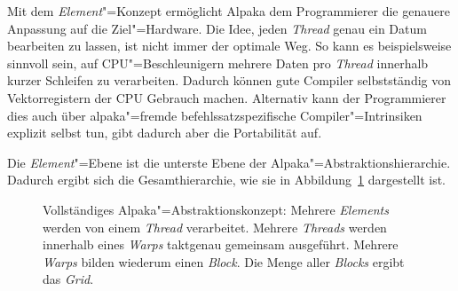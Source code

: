 Mit dem \textit{Element}"=Konzept ermöglicht Alpaka dem Programmierer die
genauere Anpassung auf die Ziel"=Hardware. Die Idee, jeden \textit{Thread} genau
ein Datum bearbeiten zu lassen, ist nicht immer der optimale Weg. So kann es
beispielsweise sinnvoll sein, auf CPU"=Beschleunigern mehrere Daten pro
\textit{Thread} innerhalb kurzer Schleifen zu verarbeiten. Dadurch können gute
Compiler selbstständig von Vektorregistern der CPU Gebrauch machen. Alternativ
kann der Programmierer dies auch über alpaka"=fremde befehlssatzspezifische
Compiler"=Intrinsiken explizit selbst tun, gibt dadurch aber die Portabilität
auf.

Die \textit{Element}"=Ebene ist die unterste Ebene der
Alpaka"=Abstraktionshierarchie. Dadurch ergibt sich die Gesamthierarchie, wie
sie in Abbildung~\ref{alpaka:konzepte:abstraktion:elements:vollstaendig}
dargestellt ist.

\begin{figure}
    \centering
    \caption[Vollständiges Alpaka-Abstraktionskonzept]
            {Vollständiges Alpaka"=Abstraktionskonzept: Mehrere
             \textit{Elements} werden von einem \textit{Thread} verarbeitet.
             Mehrere \textit{Threads} werden innerhalb eines \textit{Warps}
             taktgenau gemeinsam ausgeführt. Mehrere \textit{Warps} bilden
             wiederum einen \textit{Block}. Die Menge aller \textit{Blocks}
             ergibt das \textit{Grid}. \cite[nach][22]{worpitz2015}}
    \label{alpaka:konzepte:abstraktion:elements:vollstaendig}
\end{figure}

